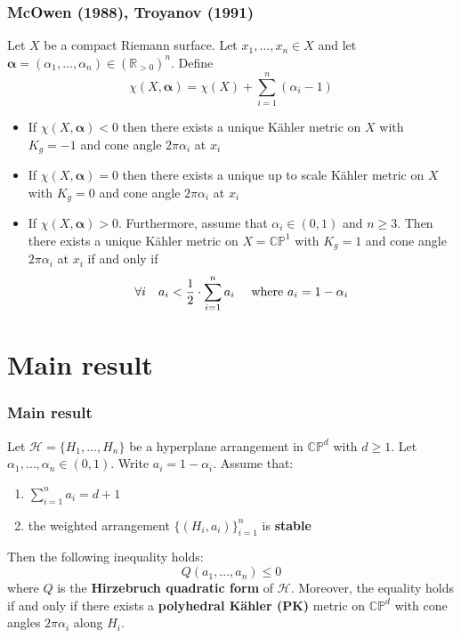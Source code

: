\documentclass{beamer}
\newcommand{\R}{\mathbb{R}}
\newcommand{\CP}{\mathbb{CP}}
\newcommand{\mH}{\mathcal{H}}
\begin{document}
\begin{frame}
	\frametitle{McOwen (1988), Troyanov (1991)}
	\pause
	Let \(X\) be a compact Riemann surface. 
	\pause
	Let \(x_1, \ldots, x_n \in X\) and let \(\bm{\alpha} = (\alpha_1, \ldots, \alpha_n) \in (\R_{>0})^n\). 
	\pause
	Define
	\[
	\chi(X, \bm{\alpha}) = \chi(X) + \sum_{i=1}^{n} (\alpha_i - 1)
	\]
	\begin{itemize}
		\pause
		\item If \(\chi(X, \bm{\alpha}) < 0\) then there exists a unique  K\"ahler metric on \(X\) with \(K_g = -1\) and cone angle \(2\pi\alpha_i\) at \(x_i\)
		\pause
		\item If \(\chi(X, \bm{\alpha}) =0\) then there exists a unique up to scale  K\"ahler metric on \(X\) with \(K_g = 0\) and cone angle \(2\pi\alpha_i\) at \(x_i\)
		\pause
		\item If \(\chi(X, \bm{\alpha}) > 0\). 
		\pause
		Furthermore, assume that \(\alpha_i \in (0,1)\) and \(n \geq 3\).
		\pause
		Then there exists a unique  K\"ahler metric on \(X = \CP^1\) with \(K_g = 1\) and cone angle \(2\pi\alpha_i\) at \(x_i\) if and only if
		\[
		\forall i \quad
		a_i < \frac{1}{2} \cdot \sum_{i=1}^{n} a_i  \quad \textup{ where } a_i = 1-\alpha_i
		\]
	\end{itemize}
\end{frame}


\section{Main result}
\begin{frame}
	\frametitle{Main result}
	\pause
	\begin{theorem}[Panov 2009 when \(d=2\), dB-Panov 2025-26 for \(d \geq 2\)]
		Let \(\mH = \{H_1, \ldots, H_n\}\) be a hyperplane arrangement in \(\CP^d\) with \(d \geq 1\). 
		\pause
		Let \(\alpha_1, \ldots, \alpha_n \in (0,1)\). Write \(a_i = 1-\alpha_i\). 
		\pause
		Assume that:
		\begin{enumerate}
			\pause
			\item\label{it:cy} \(\sum_{i=1}^{n} a_i = d+1\)
			\pause
			\item the weighted arrangement \(\{(H_i,a_i)\}_{i=1}^n\) is \textbf{stable}
		\end{enumerate}
		\pause
		Then the following inequality holds:
		\begin{equation}\label{eq:my}
		Q(a_1, \ldots, a_n) \leq 0 	
		\end{equation}
		where \(Q\) is the \textbf{Hirzebruch quadratic form} of \(\mH\). 
		\pause
		Moreover, the equality holds if and only if there exists a \textbf{polyhedral K\"ahler \textup{(PK)}} metric on \(\CP^d\) with cone angles \(2\pi\alpha_i\) along \(H_i\).
	\end{theorem}
\end{frame}
\end{document}
